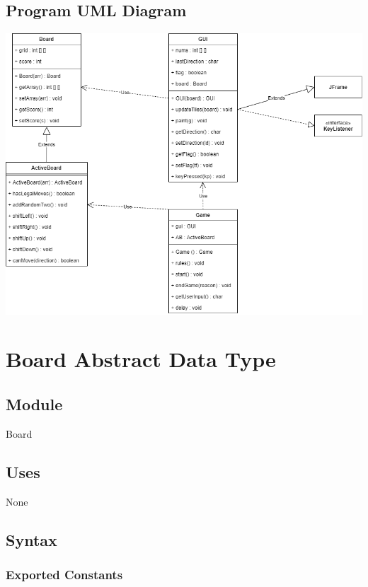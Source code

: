 \documentclass[12pt]{article}
\begin{document}
\subsection*{Program UML Diagram}
\begin{center}
    \includegraphics[scale=0.5]{A4UML.png}
\end{center}


\newpage

\section* {Board Abstract Data Type}

\subsection*{Module}

Board

\subsection* {Uses}

None

\subsection* {Syntax}

\subsubsection* {Exported Constants}
\end{document}
